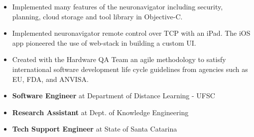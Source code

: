 \documentclass[10pt,a4paper]{altacv}
\begin{document}
\begin{itemize}
\item Implemented many features of the neuronavigator including security, planning, cloud storage and tool library in Objective-C.
\item Implemented neuronavigator remote control over TCP with an iPad.  The iOS app pioneered the use of web-stack in building a custom UI.
\item Created with the Hardware QA Team an agile methodology to satisfy international software development life cycle guidelines from agencies such as EU, FDA, and ANVISA.
\end{itemize}
\divider

\begin{itemize}

\item \textbf{Software Engineer} at Department of Distance Learning - UFSC
\item \textbf{Research Assistant} at Dept. of Knowledge Engineering
\item \textbf{Tech Support Engineer} at State of Santa Catarina
\end{itemize}

\clearpage
\end{document}

